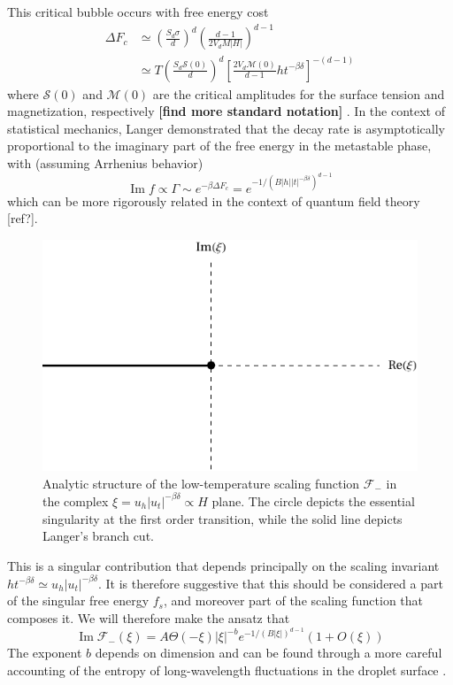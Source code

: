 \documentclass[
  aps,
  pre,
  preprint,
  longbibliography,
  floatfix
]{revtex4-2}
\begin{document}
This critical bubble occurs with free energy cost
\begin{equation}
  \begin{aligned}
    \Delta F_c
      &\simeq\left(\frac{S_d\sigma}d\right)^d\left(\frac{d-1}{2V_dM|H|}\right)^{d-1} \\
      &\simeq T\left(\frac{S_d\mathcal S(0)}d\right)^d\left[\frac{2V_d\mathcal M(0)}{d-1}ht^{-\beta\delta}\right]^{-(d-1)}
  \end{aligned}
\end{equation}
where $\mathcal S(0)$ and $\mathcal M(0)$ are the critical amplitudes for the
surface tension and magnetization, respectively \textbf{[find more standard
notation]} \cite{Kent-Dobias_2020_Novel}.
In the context of statistical mechanics, Langer demonstrated that the decay rate is asymptotically proportional to the imaginary part of the free energy in the metastable phase, with (assuming Arrhenius behavior)
\begin{equation}
  \operatorname{Im}f\propto\Gamma\sim e^{-\beta\Delta F_c}=e^{-1/(B|h||t|^{-\beta\delta})^{d-1}}
\end{equation}
which can be more rigorously related in the context of quantum field theory [ref?].

\begin{figure}
  \includegraphics{figs/F_lower_singularities.pdf}
  \caption{
    Analytic structure of the low-temperature scaling function $\mathcal F_-$
    in the complex $\xi=u_h|u_t|^{-\beta\delta}\propto H$ plane. The circle
    depicts the essential singularity at the first order transition, while the
    solid line depicts Langer's branch cut.
  } \label{fig:lower.singularities}
\end{figure}
  
This is a singular contribution that depends principally on the scaling
invariant $ht^{-\beta\delta}\simeq u_h|u_t|^{-\beta\delta}$. It is therefore
suggestive that this should be considered a part of the singular free energy
$f_s$, and moreover part of the scaling function that composes it. We will therefore make the ansatz that
\begin{equation}
  \operatorname{Im}\mathcal F_-(\xi)=A\Theta(-\xi)|\xi|^{-b}e^{-1/(B|\xi|)^{d-1}}\left(1+O(\xi)\right)
\end{equation}
\cite{Houghton_1980_The}
The exponent $b$ depends on dimension and can be found through a more careful
accounting of the entropy of long-wavelength fluctuations in the droplet
surface \cite{Gunther_1980_Goldstone}.
\end{document}
